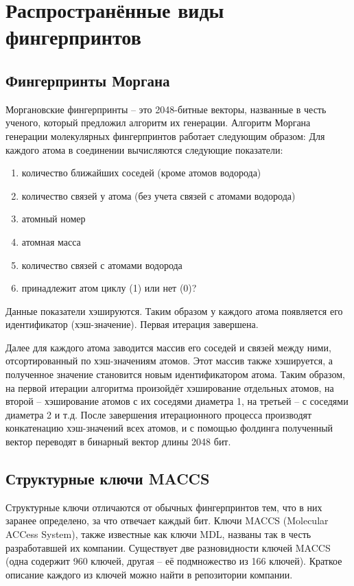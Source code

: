 \documentclass[a4paper,14pt]{extreport}
\begin{document}
  \section{Распространённые виды фингерпринтов}
  \label{s:fp_types_sec}

  \subsection{Фингерпринты Моргана}
  \label{ss:fp_morgan_subsec}
  Моргановские фингерпринты – это 2048-битные векторы, названные в честь ученого, который предложил алгоритм их генерации. Алгоритм Моргана генерации молекулярных фингерпринтов работает следующим образом:
Для каждого атома в соединении вычисляются следующие показатели:
\begin{enumerate}
\item количество ближайших соседей (кроме атомов водорода)
\item количество связей у атома (без учета связей с атомами водорода)
\item атомный номер
\item атомная масса
\item количество связей с атомами водорода
\item принадлежит атом циклу (1) или нет (0)?
\end{enumerate}
Данные показатели хэшируются. Таким образом у каждого атома появляется его идентификатор (хэш-значение). Первая итерация завершена. 

Далее для каждого атома заводится массив его соседей и связей между ними, отсортированный по хэш-значениям атомов. Этот массив также хэшируется, а полученное значение становится новым идентификатором атома. Таким образом, на первой итерации алгоритма произойдёт хэширование отдельных атомов, на второй – хэширование атомов с их соседями диаметра 1, на третьей – с соседями диаметра 2 и т.д. После завершения итерационного процесса производят конкатенацию хэш-значений всех атомов, и с помощью фолдинга полученный вектор переводят в бинарный вектор длины 2048 бит.

  \subsection{Структурные ключи MACCS}
  \label{ss:fp_maccs_subsec}
  Структурные ключи отличаются от обычных фингерпринтов тем, что в них заранее определено, за что отвечает каждый бит. Ключи MACCS (Molecular ACCess System), также известные как ключи MDL, названы так в честь разработавшей их компании. Существует две разновидности ключей MACCS (одна содержит 960 ключей, другая – её подмножество из 166 ключей). Краткое описание каждого из ключей можно найти в репозитории компании.
\end{document}
